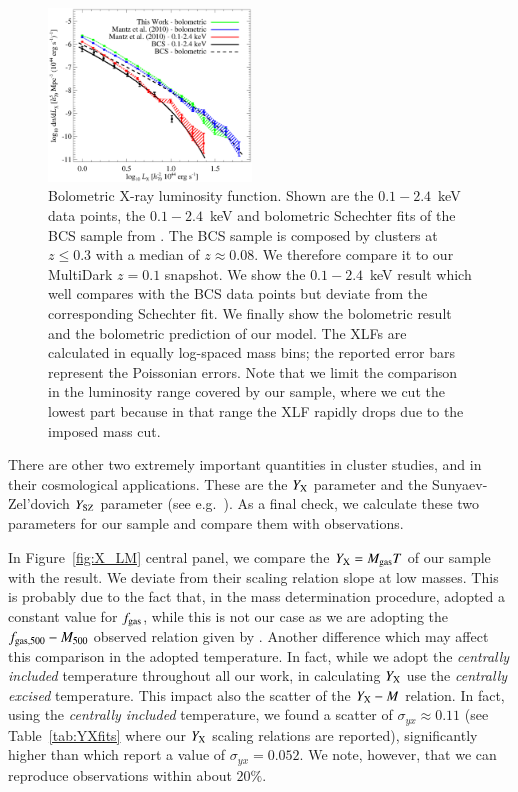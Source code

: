 \documentclass[traditabstract]{aa}
\begin{document}
\begin{figure}[hbt!]
\centering
\includegraphics[width=0.48\textwidth]{figures/xlf.eps}
\caption{Bolometric X-ray luminosity function. Shown are the $0.1-2.4$~keV data points, the $0.1-2.4$~keV and bolometric Schechter fits of the BCS sample from \cite{1997ApJ...479L.101E}. The BCS sample is composed by clusters at $z\leq0.3$ with a median of $z \approx 0.08$. We therefore compare it to our MultiDark $z=0.1$ snapshot. We show the \cite{2010MNRAS.406.1773M} $0.1-2.4$~keV result which well compares with the BCS data points but deviate from the corresponding Schechter fit. We finally show the \cite{2010MNRAS.406.1773M} bolometric result and the bolometric prediction of our model. The XLFs are calculated in equally log-spaced mass bins; the reported error bars represent the Poissonian errors. Note that we limit the comparison in the luminosity range covered by our sample, where we cut the lowest part because in that range the XLF rapidly drops due to the imposed mass cut.
}
\label{fig:XLF}
\end{figure}

There are other two extremely important quantities in cluster studies, and in their cosmological applications. These are the $Y_{\rm{X}}$ parameter \citep{2006ApJ...650..128K} and the Sunyaev-Zel'dovich $Y_{\rm{SZ}}$ parameter (see e.g.~\citealp{2002ARA&A..40..643C}). As a final check, we calculate these two parameters for our sample and compare them with observations.

In Figure~\ref{fig:X_LM} central panel, we compare the $Y_{\rm{X}} = M_{\rm{gas}} T$ of our sample with the \cite{2010MNRAS.406.1773M} result. We deviate from their scaling relation slope at low masses. This is probably due to the fact that, in the mass determination procedure, \cite{2010MNRAS.406.1773M} adopted a constant value for $f_{\rm{gas}}$, while this is not our case as we are adopting the $f_{\rm{gas},500}-M_{500}$ observed relation given by \cite{2009ApJ...693.1142S}. Another difference which may affect this comparison in the adopted temperature. In fact, while we adopt the \emph{centrally included} \cite{2010MNRAS.406.1773M} temperature throughout all our work, in calculating $Y_{\rm{X}}$ \cite{2010MNRAS.406.1773M} use the \emph{centrally excised} temperature. This impact also the scatter of the $Y_{\rm{X}}-M$ relation. In fact, using the \emph{centrally included} temperature, we found a scatter of $\sigma_{yx} \approx 0.11$ (see Table~\ref{tab:YXfits} where our $Y_{\rm{X}}$ scaling relations are reported), significantly higher than \cite{2010MNRAS.406.1773M} which report a value of $\sigma_{yx} = 0.052$. We note, however, that we can reproduce observations within about $20\%$.
\end{document}
